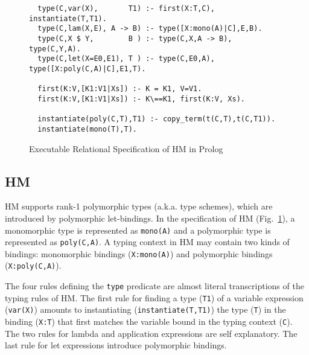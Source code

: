 \documentclass[runningheads,a4paper]{llncs}
\begin{document}
\begin{figure}[b]
\begin{verbatim}
  type(C,var(X),       T1) :- first(X:T,C), instantiate(T,T1).
  type(C,lam(X,E), A -> B) :- type([X:mono(A)|C],E,B).
  type(C,X $ Y,        B ) :- type(C,X,A -> B), type(C,Y,A).
  type(C,let(X=E0,E1), T ) :- type(C,E0,A), type([X:poly(C,A)|C],E1,T).

  first(K:V,[K1:V1|Xs]) :- K = K1, V=V1.
  first(K:V,[K1:V1|Xs]) :- K\==K1, first(K:V, Xs).
  
  instantiate(poly(C,T),T1) :- copy_term(t(C,T),t(C,T1)).
  instantiate(mono(T),T).
\end{verbatim}
\vspace*{-3ex}
\caption{Executable Relational Specification of HM in Prolog}
\label{fig:HM}
\vspace*{-2ex}
\end{figure}
\subsection{HM}\label{ssec:HM}
HM supports rank-1 polymorphic types (a.k.a. type schemes), which are
introduced by polymorphic let-bindings.
In the specification of HM (Fig.~\ref{fig:HM}), a monomorphic type is
represented as {\small\verb|mono(A)|} and a polymorphic type is represented as
{\small\verb|poly(C,A)|}. A typing context in HM may contain two kinds of
bindings: monomorphic bindings ({\small\verb|X:mono(A)|}) and
polymorphic bindings ({\small\verb|X:poly(C,A)|}).

The four rules defining the {\small\verb|type|} predicate are almost literal
transcriptions of the typing rules of HM. The first rule for finding
a type ({\small\verb|T1|}) of a variable expression ({\small\verb|var(X)|})
amounts to instantiating ({\small\verb|instantiate(T,T1)|}) the type
({\small\verb|T|}) in the binding ({\small\verb|X:T|}) that first matches
the variable bound in the typing context ({\small\verb|C|}).
The two rules for lambda and application expressions are self explanatory.
The last rule for let expressions introduce polymorphic bindings.
\end{document}
